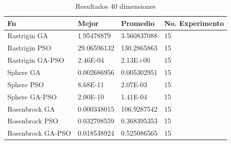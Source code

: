\documentclass[runningheads]{llncs}
\begin{document}
            \begin{table}[htp]
              \caption{Resultados 40 dimensiones}
              \label{table:resultados-2}
              \centering
              \begin{tabular}{|l|l|l|l|}
              \hline
              Fn & Mejor & Promedio & No. Experimento \\
              \hline
              \hline
              Rastrigin GA & 1.95478879 & 3.560837088 & 15\\
              \hline
              Rastrigin PSO & 29.06596132 & 130.2865863 & 15\\
              \hline
              Rastrigin GA-PSO & 2.46E-04 & 2.13E+00 & 15\\
              \hline
              Sphere GA & 0.002686956 & 0.005302951 & 15\\
              \hline
              Sphere PSO & 8.68E-11 & 2.07E-03 & 15\\
              \hline
              Sphere GA-PSO & 2.00E-10 & 1.41E-04 & 15\\
              \hline
              Rosenbrock GA & 0.000348015 & 106.9287542 & 15\\
              \hline
              Rosenbrock PSO & 0.032708559 & 0.368395353 & 15\\
              \hline
              Rosenbrock GA-PSO & 0.018538924 & 0.525086565 & 15\\
              \hline
              \end{tabular}
              \end{table}
%
%
% 
% 
%
\end{document}
